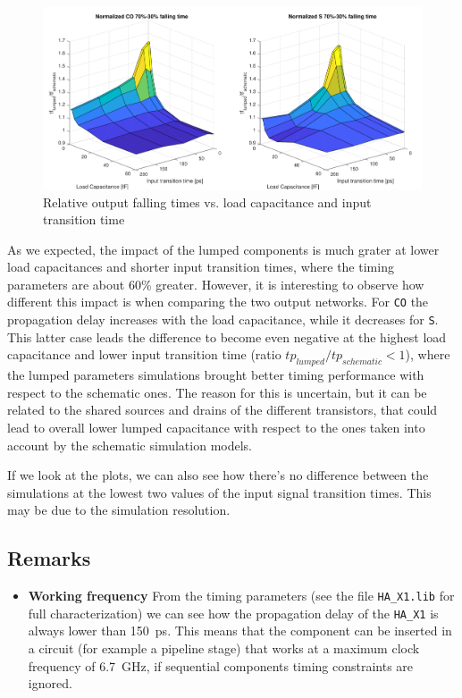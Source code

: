 \documentclass[a4paper]{article}
\newcommand{\ha}{\texttt{HA\_X1}\xspace}
\begin{document}
\begin{figure}[ht]
	\includegraphics[width=\linewidth]{Images/HA/t_F_diff_crop.pdf}
	\caption{Relative output falling times vs. load capacitance and input transition time}
	\label{fig:HA_t_F_diff}
\end{figure}

As we expected, the impact of the lumped components is much grater at lower load capacitances and shorter input transition times, where the timing parameters are about 60\% greater. However, it is interesting to observe how different this impact is when comparing the two output networks. For \texttt{CO} the propagation delay increases with the load capacitance, while it decreases for \texttt{S}. This latter case leads the difference to become even negative at the highest load capacitance and lower input transition time (ratio $tp_{lumped}/tp_{schematic} < 1$), where the lumped parameters simulations brought better timing performance with respect to the schematic ones. The reason for this is uncertain, but it can be related to the shared sources and drains of the different transistors, that could lead to overall lower lumped capacitance with respect to the ones taken into account by the schematic simulation models.

If we look at the plots, we can also see how there's no difference between the simulations at the lowest two values of the input signal transition times. This may be due to the simulation resolution.

\subsection{Remarks}

\begin{itemize}
	\item \textbf{Working frequency} From the timing parameters (see the file \texttt{HA\_X1.lib} for full characterization) we can see how the propagation delay of the \ha is always lower than \SI{150}{\pico\second}. This means that the component can be inserted in a circuit (for example a pipeline stage) that works at a maximum clock frequency of \SI{6.7}{\giga\hertz}, if sequential components timing constraints are ignored.
\end{itemize}
\end{document}
